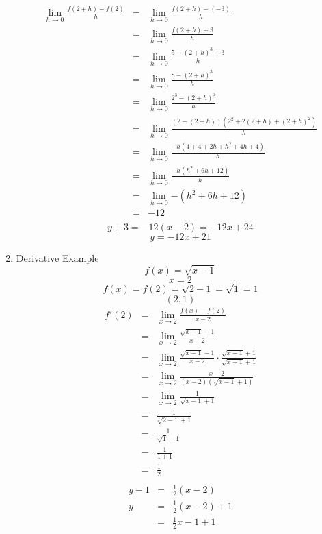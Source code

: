 \documentclass{article}
\begin{document}
\begin{enumerate}
\begin{eqnarray}
        \lim_{h \to 0}{\frac{f(2 + h) - f(2)}{h}} &=& \lim_{h \to 0}{\frac{f(2 + h) - (-3)}{h}} \\
        &=& \lim_{h \to 0}{\frac{f(2 + h) + 3}{h}} \\
        &=& \lim_{h \to 0}{\frac{5 - (2 + h)^3 + 3}{h}} \\
        &=& \lim_{h \to 0}{\frac{8 - (2 + h)^3}{h}} \\
        &=& \lim_{h \to 0}{\frac{2^3 - (2 + h)^3}{h}} \\
        &=& \lim_{h \to 0}{\frac{(2 - (2 + h))(2^2 + 2(2 + h) + (2 + h)^2)}{h}} \\
        &=& \lim_{h \to 0}{\frac{-h(4 + 4 + 2h + h^2 + 4h + 4)}{h}} \\
        &=& \lim_{h \to 0}{\frac{-h(h^2 + 6h + 12)}{h}} \\
        &=& \lim_{h \to 0}{-(h^2 + 6h + 12)} \\
        &=& -12 \\
    \end{eqnarray}
    $$y+3 = -12(x-2) = -12x + 24$$
    $$y = -12x + 21$$
    \item Derivative Example
    $$f(x) = \sqrt{x - 1}$$
    $$x = 2$$
    $$f(x) = f(2) = \sqrt{2 - 1} = \sqrt{1} = 1$$
    $$(2, 1)$$
    \begin{eqnarray}
        f'(2) &=& \lim_{x \to 2}{\frac{f(x) - f(2)}{x - 2}} \\
              &=& \lim_{x \to 2}{\frac{\sqrt{x - 1} - 1}{x - 2}} \\
              &=& \lim_{x \to 2}{\frac{\sqrt{x - 1} - 1}{x - 2} \cdot \frac{\sqrt{x - 1} + 1}{\sqrt{x - 1} + 1}} \\
              &=& \lim_{x \to 2}{\frac{x - 2}{(x - 2)(\sqrt{x - 1} + 1)}} \\
              &=& \lim_{x \to 2}{\frac{1}{\sqrt{x - 1} + 1}} \\
              &=& \frac{1}{\sqrt{2 - 1} + 1} \\
              &=& \frac{1}{\sqrt{1} + 1} \\
              &=& \frac{1}{1 + 1} \\
              &=& \frac{1}{2} \\
    \end{eqnarray}
    \begin{eqnarray}
        y - 1 &=& \frac{1}{2}(x - 2) \\
        y &=& \frac{1}{2}(x - 2) + 1 \\
        &=& \frac{1}{2}x - 1 + 1 \\

\end{eqnarray}
\end{enumerate}
\end{document}
